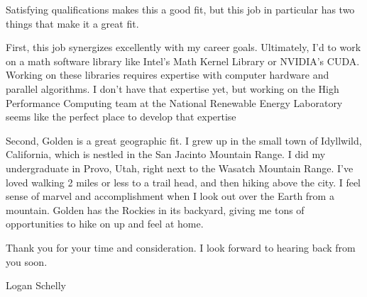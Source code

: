 \documentclass{article}
\begin{document}
Satisfying qualifications makes this a good fit,
but this job in particular has two things that make it a great fit. 

First, this job synergizes excellently with my career goals.
Ultimately, I'd to work on a math software library like Intel's Math Kernel Library or NVIDIA's CUDA.
Working on these libraries requires expertise with computer hardware and parallel algorithms.
I don't have that expertise yet, but working on the High Performance Computing team at the National Renewable Energy Laboratory
seems like the perfect place to develop that expertise

Second, Golden is a great geographic fit.
I grew up in the small town of Idyllwild, California, which is nestled in the San Jacinto Mountain Range.
I did my undergraduate in Provo, Utah, right next to the Wasatch Mountain Range.
I've loved walking 2 miles or less to a trail head, and then hiking above the city.
I feel sense of marvel and accomplishment when I look out over the Earth from a mountain.
Golden has the Rockies in its backyard, giving me tons of opportunities to hike on up and feel at home.

Thank you for your time and consideration.
I look forward to hearing back from you soon.

\bigskip
\noindent Logan Schelly
  
\end{document}
